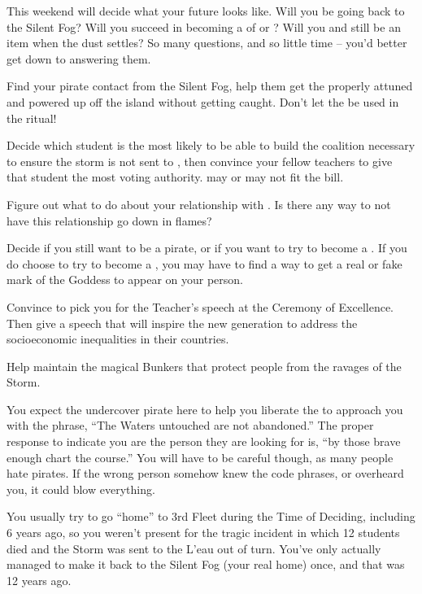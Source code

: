 \documentclass[char]{GL2020}
\begin{document}
This weekend will decide what your future looks like. Will you be going back to the Silent Fog? Will you succeed in becoming a \cPirate{\cleric} of \cEbb{} or \cFlow{}? Will you and \cPrince{} still be an item when the dust settles? So many questions, and so little time  -- you'd better get down to answering them.

\begin{itemz}
	\item Find your pirate contact from the Silent Fog, help them get the properly attuned and powered up \iNet{} off the island without getting caught. Don't let the \iNet{} be used in the ritual!
	\item Decide which \pShip{} student is the most likely to be able to build the coalition necessary to ensure the storm is not sent to \pShip{}, then convince your fellow teachers to give that student the most voting authority. \cWarlordDaughter{} may or may not fit the bill.
	\item Figure out what to do about your relationship with \cPrince{}. Is there any way to not have this relationship go down in flames?
	\item Decide if you still want to be a pirate, or if you want to try to become a \cPirate{\cleric}. If you do choose to try to become a \cPirate{\cleric}, you may have to find a way to get a real or fake mark of the Goddess to appear on your person.
	\item Convince \cMusic{} to pick you for the Teacher's speech at the Ceremony of Excellence. Then give a speech that will inspire the new generation to address the socioeconomic inequalities in their countries.
	\item Help \cBunker{} maintain the magical Bunkers that protect people from the ravages of the Storm.

\end{itemz}

\begin{itemz}[Notes]
	\item You expect the undercover pirate here to help you liberate the \iNet{} to approach you with the phrase, ``The Waters untouched are not abandoned.'' The proper response to indicate you are the person they are looking for is, ``by those brave enough chart the course.'' You will have to be careful though, as many people hate pirates. If the wrong person somehow knew the code phrases, or overheard you, it could blow everything.
	\item You usually try to go ``home'' to 3rd Fleet during the Time of Deciding, including 6 years ago, so you weren't present for the tragic incident in which 12 students died and the Storm was sent to the L'eau out of turn. You've only actually managed to make it back to the Silent Fog (your real home) once, and that was 12 years ago.
\end{itemz}
\end{document}
